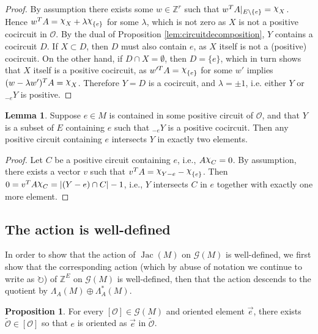 \documentclass[12pt]{amsart}
\newcommand{\ZZ}{\mathbb{Z}}
\numberwithin{equation}{section}
\theoremstyle{definition}
\newtheorem{lemma}[theorem]{Lemma}
\newtheorem{proposition}[theorem]{Proposition}
\newcommand{\Jac}{\operatorname{Jac}}
\DeclareRobustCommand{\rchi}{{\mathpalette\irchi\relax}}
\newcommand{\irchi}[2]{\raisebox{\depth}{$#1\chi$}}
\begin{document}
\begin{proof}
By assumption there exists some $w\in\mathbb{Z}^r$ such that $w^TA|_{E\setminus\{e\}}=\rchi_X$. Hence $w^TA=\rchi_X+\lambda\rchi_{\{e\}}$ for some $\lambda$, which is not zero as $X$ is not a positive cocircuit in $\mathcal{O}$. By the dual of Proposition \ref{lem:circuitdecomposition}, $Y$ contains a cocircuit $D$. 
If $X\subset D$, then $D$ must also contain $e$, as $X$ itself is not a (positive) cocircuit.  On the other hand, if $D\cap X=\emptyset$, then $D=\{e\}$, which in turn shows that $X$ itself is a positive cocircuit, as $w'^TA=\rchi_{\{e\}}$ for some $w'$ implies $(w-\lambda w')^TA=\rchi_X$. Therefore $Y=D$ is a cocircuit, and $\lambda=\pm 1$, i.e. either $Y$ or $_{-e}Y$ is positive. 
\end{proof}

\begin{lemma} \label{Lem:AlmostPosCC}
Suppose $e \in M$ is contained in some positive circuit of $\mathcal{O}$, and that $Y$ is a subset of $E$ containing $e$ such that $_{-e}Y$ is a positive cocircuit. Then any positive circuit containing $e$ intersects $Y$ in exactly two elements.
\end{lemma}

\begin{proof}
Let $C$ be a positive circuit containing $e$, i.e., $A\rchi_C=0$. By assumption, there exists a vector $v$ such that $v^TA=\rchi_{Y-e}-\rchi_{\{e\}}$.  Then  $0=v^TA\rchi_C=|(Y-e)\cap C|-1$, i.e., $Y$ intersects $C$ in $e$ together with exactly one more element.
\end{proof}

\subsection{The action is well-defined}

In order to show that the action of $\Jac(M)$ on $\mathcal{G}(M)$ is well-defined, we first show that the corresponding action (which by abuse of notation we continue to write as $\circlearrowright$) of $\ZZ^E$ on $\mathcal{G}(M)$ is well-defined, then that the action descends to the quotient by $\Lambda_A(M)\oplus \Lambda_A^*(M)$.



\begin{proposition} \label{Prop:Torsor_WellDef}
For every $[\mathcal{O}]\in\mathcal{G}(M)$ and oriented element $\overrightarrow{e}$, there exists $\tilde{\mathcal{O}}\in [\mathcal{O}]$ so that $e$ is oriented as $\overrightarrow{e}$ in $\tilde{\mathcal{O}}$.
\end{proposition}
\end{document}
